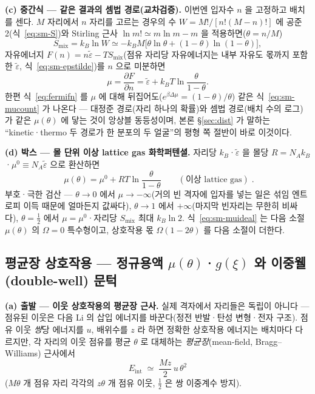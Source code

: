 \documentclass[11pt,a4paper]{article}
\begin{document}
\textbf{(c) 중간식 --- 같은 결과의 셈법 경로(교차검증).} 이번엔 입자수 $n$ 을 고정하고 배치를 센다.
$M$ 자리에서 $n$ 자리를 고르는 경우의 수 $W=M!/[n!(M-n)!]$ 에 공준 2(식~\eqref{eq:sm-S})와 Stirling 근사
$\ln m!\simeq m\ln m-m$ 을 적용하면($\theta=n/M$)
\begin{equation}
S_\mathrm{mix}=k_B\ln W\simeq-k_BM\big[\theta\ln\theta+(1-\theta)\ln(1-\theta)\big],
\label{eq:sm-Smix}
\end{equation}
자유에너지 $F(n)=n\tilde\varepsilon-TS_\mathrm{mix}$(점유 자리당 자유에너지는 내부 자유도 몫까지 포함한
$\tilde\varepsilon$, 식~\eqref{eq:sm-epstilde})를 $n$ 으로 미분하면
\begin{equation}
\mu=\frac{\partial F}{\partial n}
=\tilde\varepsilon+k_BT\ln\frac{\theta}{1-\theta}.
\label{eq:sm-mucount}
\end{equation}
한편 식~\eqref{eq:fermifn} 를 $\mu$ 에 대해 뒤집어도($e^{\beta\Delta\mu}=(1-\theta)/\theta$) 같은
식~\eqref{eq:sm-mucount} 가 나온다 --- 대정준 경로(자리 하나의 확률)와 셈법 경로(배치 수의 로그)가 같은
$\mu(\theta)$ 에 닿는 것이 앙상블 동등성이며, 본론 \S\ref{sec:dist} 가 말하는 ``kinetic·thermo 두 경로가 한
분포의 두 얼굴''의 평형 쪽 절반이 바로 이것이다.

\textbf{(d) 박스 --- 몰 단위 이상 lattice gas 화학퍼텐셜.} 자리당 $k_B$·$\tilde\varepsilon$ 을 몰당
$R=N_Ak_B$·$\mu^0\equiv N_A\tilde\varepsilon$ 으로 환산하면
\begin{equation}
\boxed{\;\mu(\theta)=\mu^0+RT\ln\frac{\theta}{1-\theta}\qquad(\text{이상 lattice gas})\;.}
\label{eq:sm-muideal}
\end{equation}
부호·극한 검산 --- $\theta\to0$ 에서 $\mu\to-\infty$(거의 빈 격자에 입자를 넣는 일은 섞임 엔트로피 이득 때문에
얼마든지 값싸다), $\theta\to1$ 에서 $+\infty$(마지막 빈자리는 무한히 비싸다), $\theta=\tfrac12$ 에서
$\mu=\mu^0$·자리당 $S_\mathrm{mix}$ 최대 $k_B\ln2$. 식~\eqref{eq:sm-muideal} 는 다음 소절 $\mu(\theta)$ 의
$\Omega=0$ 특수형이고, 상호작용 몫 $\Omega(1-2\theta)$ 를 다음 소절이 더한다.
\subsection{평균장 상호작용 --- 정규용액 $\mu(\theta)$·$g(\xi)$ 와 이중웰(double-well) 문턱}\label{sec:sm-mf}
\textbf{(a) 출발 --- 이웃 상호작용의 평균장 근사.} 실제 격자에서 자리들은 독립이 아니다 --- 점유된 이웃은 다음
Li 의 삽입 에너지를 바꾼다(정전 반발·탄성 변형·전자 구조). 점유 이웃 \emph{쌍}당 에너지를 $u$, 배위수를 $z$
라 하면 정확한 상호작용 에너지는 배치마다 다르지만, 각 자리의 이웃 점유를 평균 $\theta$ 로 대체하는
\emph{평균장}(mean-field, Bragg--Williams) 근사에서
\begin{equation}
E_\mathrm{int}\;\simeq\;\frac{Mz}{2}\,u\,\theta^2
\label{eq:sm-mf}
\end{equation}
($M\theta$ 개 점유 자리 각각의 $z\theta$ 개 점유 이웃, $\tfrac12$ 은 쌍 이중계수 방지).
\end{document}
